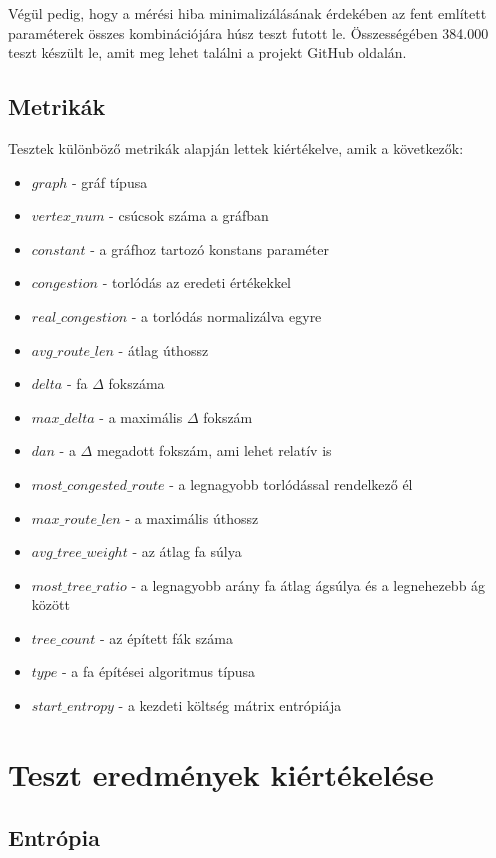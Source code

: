 \documentclass[12pt]{report}
\begin{document}
Végül pedig, hogy a mérési hiba minimalizálásának érdekében az fent említett paraméterek összes kombinációjára húsz teszt futott le. 
Összességében 384.000 teszt készült le, amit meg lehet találni a projekt GitHub oldalán.

\section{Metrikák}

Tesztek különböző metrikák alapján lettek kiértékelve, amik a következők:

\begin{itemize}
	\item $graph$ - gráf típusa 
	\item $vertex\_num$ - csúcsok száma a gráfban
	\item $constant$ - a gráfhoz tartozó konstans paraméter 
	\item $congestion$ - torlódás az eredeti értékekkel
	\item $real\_congestion$ - a torlódás normalizálva egyre
	\item $avg\_route\_len$ - átlag úthossz
	\item $delta$ - fa $\Delta$ fokszáma
	\item $max\_delta$ - a maximális $\Delta$ fokszám
	\item $dan$ - a $\Delta$ megadott fokszám, ami lehet relatív is
	\item $most\_congested\_route$ - a legnagyobb torlódással rendelkező él
	\item $max\_route\_len$ - a maximális úthossz
	\item $avg\_tree\_weight$ - az átlag fa súlya
	\item $most\_tree\_ratio$ - a legnagyobb arány fa átlag ágsúlya és a legnehezebb ág között
	\item $tree\_count$ - az épített fák száma
	\item $type$ - a fa építései algoritmus típusa
	\item $start\_entropy$ - a kezdeti költség mátrix entrópiája
\end{itemize}
	

\chapter{Teszt eredmények kiértékelése}

\section{Entrópia}
\end{document}
